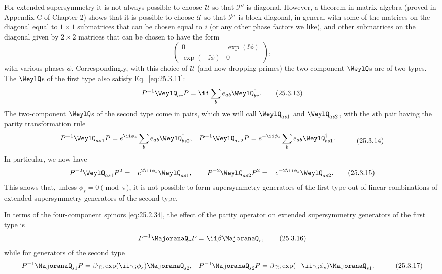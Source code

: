 For extended supersymmetry it is not always possible to choose \(\mathcal U\)
so that \(\mathcal P'\) is diagonal. However, a theorem in matrix algebra
(proved in Appendix C of Chapter 2) shows that it is possible to choose
\(\mathcal U\) so that \(\mathcal P'\) is block diagonal, in general with
some of the matrices on the diagonal equal to \(1\times1\) submatrices that
can be chosen equal to \(i\) (or any other phase factors we like), and other
submatrices on the diagonal given by \(2\times2\) matrices that can be chosen
to have the form
\[
\begin{pmatrix}
0&\exp(\ii\phi)\\
\exp(-\ii\phi)&0
\end{pmatrix},
\]
with various phases \(\phi\). Correspondingly, with this choice of
\(\mathcal U\) (and now dropping primes) the two-component \(\WeylQ\)s are of
two types. The \(\WeylQ\)s of the first type also satisfy
Eq.~\eqref{eq:25.3.11}:
\begin{equation}
P^{-1}\WeylQ_{ar}P
=\ii\sum_b e_{ab}\WeylQ_{br}^\dagger.
\tag{25.3.13}\label{eq:25.3.13}
\end{equation}
The two-component \(\WeylQ\)s of the second type come in pairs, which we will
call \(\WeylQ_{as1}\) and \(\WeylQ_{as2}\), with the \(s\)th pair having the
parity transformation rule
\begin{equation}
\begin{aligned}
P^{-1}\WeylQ_{as1}P
&=e^{\ii\phi_s}\sum_b e_{ab}\WeylQ_{bs2}^{\dagger},
&
P^{-1}\WeylQ_{as2}P
&=e^{-\ii\phi_s}\sum_b e_{ab}\WeylQ_{bs1}^{\dagger}.
\end{aligned}
\tag{25.3.14}\label{eq:25.3.14}
\end{equation}
In particular, we now have
\begin{equation}
P^{-2}\WeylQ_{as1}P^2=-e^{2\ii\phi_s}\WeylQ_{as1},
\qquad
P^{-2}\WeylQ_{as2}P^2=-e^{-2\ii\phi_s}\WeylQ_{as2}.
\tag{25.3.15}\label{eq:25.3.15}
\end{equation}
This shows that, unless \(\phi_s=0\pmod{\pi}\), it is not possible to form
supersymmetry generators of the first type out of linear combinations of
extended supersymmetry generators of the second type.

In terms of the four-component spinors \eqref{eq:25.2.34}, the effect of the
parity operator on extended supersymmetry generators of the first type is
\begin{equation}
P^{-1}\MajoranaQ_rP=\ii\beta\MajoranaQ_r,
\tag{25.3.16}\label{eq:25.3.16}
\end{equation}
while for generators of the second type
\begin{equation}
\begin{aligned}
P^{-1}\MajoranaQ_{s1}P
&=\beta\gamma_5\exp(\ii\gamma_5\phi_s)\MajoranaQ_{s2},
&
P^{-1}\MajoranaQ_{s2}P
&=\beta\gamma_5\exp(-\ii\gamma_5\phi_s)\MajoranaQ_{s1}.
\end{aligned}
\tag{25.3.17}\label{eq:25.3.17}
\end{equation}
